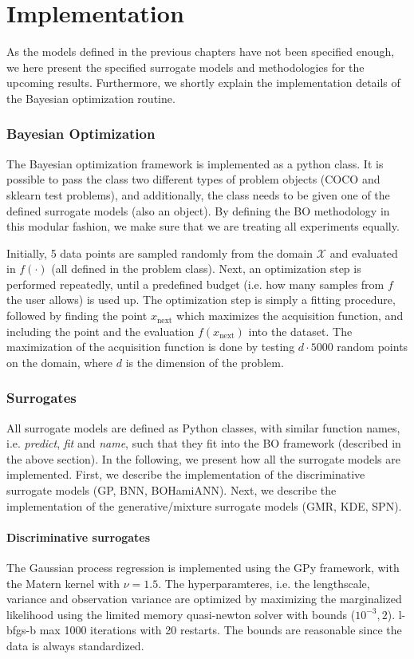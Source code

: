 \chapter{Implementation}
As the models defined in the previous chapters have not been specified enough, we here 
present the specified surrogate models and methodologies for the upcoming results. Furthermore, 
we shortly explain the implementation details of the Bayesian optimization routine. 

\subsection{Bayesian Optimization}
The Bayesian optimization framework is implemented as a python class. It is possible to pass the class two
different types of problem objects (COCO and sklearn test problems), and additionally, the class
needs to be given one of the defined surrogate models (also an object). By defining the BO methodology
in this modular fashion, we make sure that we are treating all experiments equally. 

Initially, 5 data points are sampled randomly from the domain $\mathcal{X}$ and evaluated in
$f(\cdot)$ (all defined in the problem class). Next, an optimization step is performed repeatedly,
until a predefined budget (i.e. how many samples from $f$ the user allows) is used up. The
optimization step is simply a fitting procedure, followed by finding the point $x_{\text{next}}$
which maximizes the acquisition function, and including the point and the evaluation
$f(x_{\text{next}})$ into the dataset. The maximization of the acquisition function is done by
testing $d\cdot 5000$ random points on the domain, where $d$ is the dimension of the problem. 

\subsection{Surrogates}
All surrogate models are defined as Python classes, with similar function names, i.e.
\textit{predict}, \textit{fit} and \textit{name}, such that they fit into the BO framework
(described in the above section). In the following, we present how all the surrogate models are
implemented. First, we describe the implementation of the discriminative surrogate models (GP, BNN, BOHamiANN). Next,  
we describe the implementation of the generative/mixture surrogate models (GMR, KDE, SPN). 

\subsubsection{Discriminative surrogates}
The Gaussian process regression is implemented using the GPy framework, with the Matern kernel with
$\nu=1.5$. The hyperparamteres, i.e. the lengthscale, variance and observation variance are
optimized by maximizing the marginalized likelihood using the limited memory quasi-newton solver
with bounds ($10^{-3}, 2$). l-bfgs-b max 1000 iterations with 20 restarts. 
The bounds are reasonable since the data is always standardized. 

